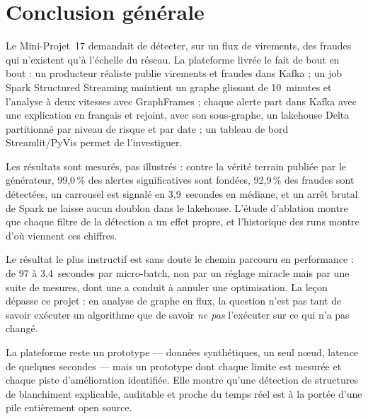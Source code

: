\chapter*{Conclusion générale}

Le Mini-Projet~17 demandait de détecter, sur un flux de virements, des
fraudes qui n'existent qu'à l'échelle du réseau. La plateforme livrée le fait
de bout en bout : un producteur réaliste publie virements et fraudes dans
Kafka ; un job Spark Structured Streaming maintient un graphe glissant de
10~minutes et l'analyse à deux vitesses avec GraphFrames ; chaque alerte part
dans Kafka avec une explication en français et rejoint, avec son sous-graphe,
un lakehouse Delta partitionné par niveau de risque et par date ; un tableau
de bord Streamlit/PyVis permet de l'investiguer.

Les résultats sont mesurés, pas illustrés : contre la vérité terrain publiée
par le générateur, 99,0\,\% des alertes significatives sont fondées,
92,9\,\% des fraudes sont détectées, un carrousel est signalé en
3,9~secondes en médiane, et un arrêt brutal de Spark ne laisse aucun doublon
dans le lakehouse. L'étude d'ablation montre que chaque filtre de la
détection a un effet propre, et l'historique des runs montre d'où viennent
ces chiffres.

Le résultat le plus instructif est sans doute le chemin parcouru en
performance : de 97 à 3,4~secondes par micro-batch, non par un réglage
miracle mais par une suite de mesures, dont une a conduit à annuler une
optimisation. La leçon dépasse ce projet : en analyse de graphe en flux, la
question n'est pas tant de savoir exécuter un algorithme que de savoir
\emph{ne pas} l'exécuter sur ce qui n'a pas changé.

La plateforme reste un prototype --- données synthétiques, un seul nœud,
latence de quelques secondes --- mais un prototype dont chaque limite est
mesurée et chaque piste d'amélioration identifiée. Elle montre qu'une
détection de structures de blanchiment explicable, auditable et proche du
temps réel est à la portée d'une pile entièrement open source.

